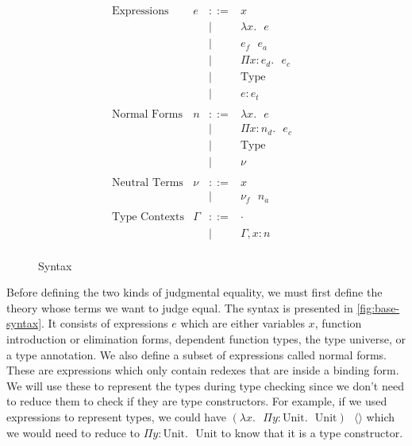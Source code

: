 \documentclass[sigplan]{acmart}
\newcommand{\bnfdef}{::=}
\newcommand{\bnfalt}{\mid}
\newcommand{\bnfcomment}[1]{}%
\newcommand{\lamE}[2]{\lambda #1. \text{ } #2}
\newcommand{\appE}[2]{#1 \text{ } #2}
\newcommand{\piE}[3]{\Pi #1 : #2. \text{ } #3}
\newcommand{\unitE}{\langle \rangle}
\newcommand{\unittE}{\text{Unit}}
\newcommand{\univE}{\text{Type}}
\newcommand{\annE}[2]{#1 : #2}
\begin{document}
\begin{figure}[!htb]
  \begin{displaymath}
    \begin{array}{lrcll}
      \text{Expressions} & e & \bnfdef & x & \bnfcomment{variables} \\
      & & \bnfalt & \lamE{x}{e} & \bnfcomment{function literal} \\
      & & \bnfalt & \appE{e_f}{e_a} & \bnfcomment{function application} \\
      & & \bnfalt & \piE{x}{e_d}{e_c} & \bnfcomment{dependent function type} \\
      & & \bnfalt & \univE & \bnfcomment{type universe} \\
      & & \bnfalt & \annE{e}{e_t} & \bnfcomment{type annotation} \\
      \\
      \text{Normal Forms} & n & \bnfdef & \lamE{x}{e} & \\
      & & \bnfalt & \piE{x}{n_d}{e_c} & \\
      & & \bnfalt & \univE & \\
      & & \bnfalt & \nu & \\
      \\
      \text{Neutral Terms} & \nu & \bnfdef & x & \\
      & & \bnfalt & \appE{\nu_f}{n_a} & \\
      \\
      \text{Type Contexts} & \Gamma & \bnfdef & \cdot & \\
      & & \bnfalt & \Gamma, x : n & \\
    \end{array}
  \end{displaymath}
  \caption{Syntax}
  \label{fig:base-syntax}
\end{figure}

Before defining the two kinds of judgmental equality, we must first define the theory whose terms we want to judge equal.
The syntax is presented in \autoref{fig:base-syntax}.
It consists of expressions $e$ which are either variables $x$, function introduction or elimination forms, dependent function types, the type universe, or a type annotation.
We also define a subset of expressions called normal forms.
These are expressions which only contain redexes that are inside a binding form.
We will use these to represent the types during type checking since we don't need to reduce them to check if they are type constructors.
For example, if we used expressions to represent types, we could have $\appE{(\lamE{x}{\piE{y}{\unittE}{\unittE}})}{\unitE}$ which we would need to reduce to $\piE{y}{\unittE}{\unittE}$ to know that it is a type constructor.
\end{document}
